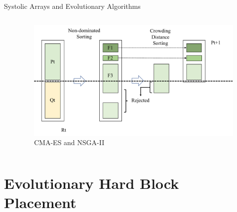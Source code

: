 \documentclass[10pt]{beamer}
\begin{document}
\begin{frame}{Systolic Arrays and Evolutionary Algorithms}
\begin{columns}[T, onlytextwidth]
    \vspace{-0.2cm}
    \begin{center}
    \end{center}

    \vspace{-0.3cm}
    \begin{figure}
      \includegraphics[width=\textwidth]{img/NSGA-II.pdf}
      \caption{CMA-ES and NSGA-II}
    \end{figure}

  \end{columns}

\end{frame}


\section{Evolutionary Hard Block Placement}
\end{document}
